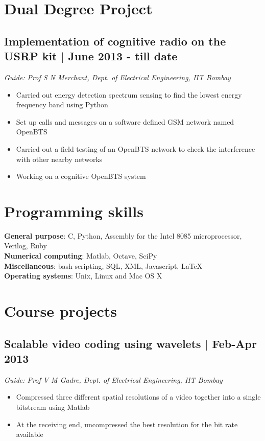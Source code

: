 \documentclass[12pt]{article}
\begin{document}
\setlength{\parindent}{0pt}
 


\vspace*{7\baselineskip}

\section*{Dual Degree Project}

\subsection*{Implementation of cognitive radio on the USRP kit $\vert$  June 2013 - till date}
\emph{Guide: Prof S N Merchant, Dept. of Electrical Engineering, IIT Bombay} 
\begin{itemize}
\item Carried out energy detection spectrum sensing to find the lowest energy frequency band using Python
\item Set up calls and messages on a software defined GSM network named OpenBTS
\item Carried out a field testing of an OpenBTS network to check the interference with other nearby networks 
\item Working on a cognitive OpenBTS system 
\end{itemize}

\section*{Programming skills}
\textbf{General purpose}: C, Python, Assembly for the Intel 8085 microprocessor, Verilog, Ruby \\
\textbf{Numerical computing}: Matlab, Octave, SciPy \\
\textbf{Miscellaneous}: bash scripting, SQL, XML, Javascript, LaTeX \\
\textbf{Operating systems}: Unix, Linux and Mac OS X

\section*{Course projects}
\subsection*{Scalable video coding using wavelets $\vert$  Feb-Apr 2013}
\emph{Guide: Prof V M Gadre, Dept. of Electrical Engineering, IIT Bombay} 
\begin{itemize} 
\item Compressed three different spatial resolutions of a video together into a single bitstream using Matlab
\item At the receiving end, uncompressed the best resolution for the bit rate available 
\end{itemize}
\end{document}
